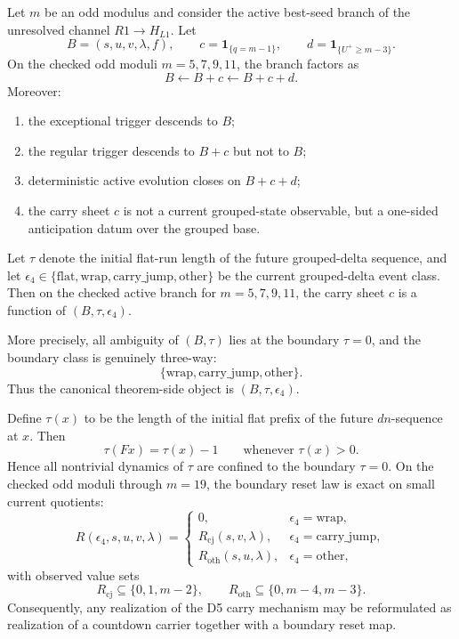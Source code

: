 
\begin{theorem}
Let $m$ be an odd modulus and consider the active best-seed branch of the
unresolved channel $R1\to H_{L1}$. Let
\[
B=(s,u,v,\lambda,f),
\qquad
c=\mathbf 1_{\{q=m-1\}},
\qquad
d=\mathbf 1_{\{U^+\ge m-3\}}.
\]
On the checked odd moduli $m=5,7,9,11$, the branch factors as
\[
B \leftarrow B+c \leftarrow B+c+d.
\]
Moreover:
\begin{enumerate}
    \item the exceptional trigger descends to $B$;
    \item the regular trigger descends to $B+c$ but not to $B$;
    \item deterministic active evolution closes on $B+c+d$;
    \item the carry sheet $c$ is not a current grouped-state observable, but a
    one-sided anticipation datum over the grouped base.
\end{enumerate}
\end{theorem}

\begin{theorem}
Let $\tau$ denote the initial flat-run length of the future grouped-delta
sequence, and let $\epsilon_4\in\{\mathrm{flat},\mathrm{wrap},\mathrm{carry\_jump},\mathrm{other}\}$
be the current grouped-delta event class. Then on the checked active branch for $m=5,7,9,11$,
the carry sheet $c$ is a function of $(B,\tau,\epsilon_4)$.

More precisely, all ambiguity of $(B,\tau)$ lies at the boundary $\tau=0$,
and the boundary class is genuinely three-way:
\[
\{\mathrm{wrap},\mathrm{carry\_jump},\mathrm{other}\}.
\]
Thus the canonical theorem-side object is $(B,\tau,\epsilon_4)$.
\end{theorem}

\begin{proposition}
Define $\tau(x)$ to be the length of the initial flat prefix of the future
$dn$-sequence at $x$. Then
\[
\tau(Fx)=\tau(x)-1 \qquad \text{whenever } \tau(x)>0.
\]
Hence all nontrivial dynamics of $\tau$ are confined to the boundary $\tau=0$.
On the checked odd moduli through $m=19$, the boundary reset law is exact on
small current quotients:
\[
R(\epsilon_4,s,u,v,\lambda)=
\begin{cases}
0, & \epsilon_4=\mathrm{wrap},\\
R_{\mathrm{cj}}(s,v,\lambda), & \epsilon_4=\mathrm{carry\_jump},\\
R_{\mathrm{oth}}(s,u,\lambda), & \epsilon_4=\mathrm{other},
\end{cases}
\]
with observed value sets
\[
R_{\mathrm{cj}}\subseteq\{0,1,m-2\},
\qquad
R_{\mathrm{oth}}\subseteq\{0,m-4,m-3\}.
\]
Consequently, any realization of the D5 carry mechanism may be reformulated as
realization of a countdown carrier together with a boundary reset map.
\end{proposition}

